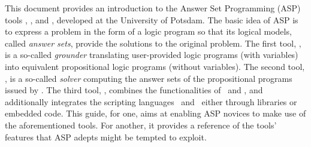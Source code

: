 
This document provides an introduction to the Answer Set Programming (ASP) tools
\gringo, \clasp, and \clingo, developed at the University of Potsdam.
The basic idea of ASP is to express a problem in the form of a logic program so that
its logical models, called \emph{answer sets}, provide the solutions to the original problem.
%
The first tool, \gringo, is a so-called \emph{grounder} translating
user-provided logic programs (with variables) into equivalent propositional logic programs (without variables).
%
The second tool, \clasp, is a so-called \emph{solver} computing
the answer sets of the propositional programs issued by \gringo.
The third tool, \clingo, combines the functionalities of \gringo\ and \clasp,
and additionally integrates the scripting languages \lua\ and \python\ either
through libraries or embedded code.
This guide, for one, aims at enabling ASP novices
to make use of the aforementioned tools.
For another, it provides a reference of the tools' features
that ASP adepts might be tempted to exploit.

